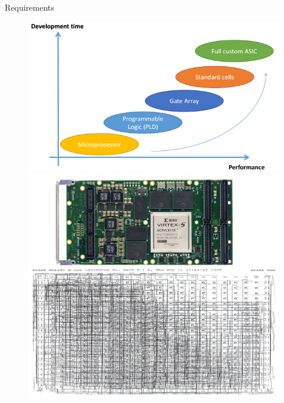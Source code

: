 \documentclass[t,12pt,english
\ifx\beamermode\undefined\else,\beamermode\fi
]{beamer}
\begin{document}
\begin{frame}{Requirements}
\begin{figure}[!htb]
\includegraphics[width=.87\textwidth]{1.png}
\endminipage
{}
\centering
\includegraphics[width=.71\textwidth]{3.png}
\endminipage
\end{figure}



\end{frame}
\end{document}
